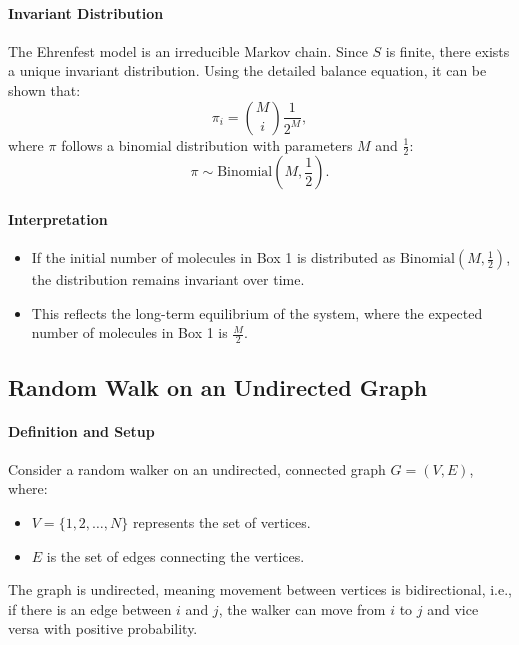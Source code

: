\paragraph{Invariant Distribution}
The Ehrenfest model is an irreducible Markov chain. Since \( S \) is finite, there exists a unique invariant distribution. Using the detailed balance equation, it can be shown that:
\[
\pi_i = \binom{M}{i} \frac{1}{2^M},
\]
where \( \pi \) follows a binomial distribution with parameters \( M \) and \( \frac{1}{2} \):
\[
\pi \sim \text{Binomial}(M, \frac{1}{2}).
\]

\paragraph{Interpretation}
\begin{itemize}
    \item If the initial number of molecules in Box 1 is distributed as \( \text{Binomial}(M, \frac{1}{2}) \), the distribution remains invariant over time.
    \item This reflects the long-term equilibrium of the system, where the expected number of molecules in Box 1 is \( \frac{M}{2} \).
\end{itemize}


\subsection{Random Walk on an Undirected Graph}

\paragraph{Definition and Setup}
Consider a random walker on an undirected, connected graph \( G = (V, E) \), where:
\begin{itemize}
    \item \( V = \{1, 2, \dots, N\} \) represents the set of vertices.
    \item \( E \) is the set of edges connecting the vertices.
\end{itemize}
The graph is undirected, meaning movement between vertices is bidirectional, i.e., if there is an edge between \( i \) and \( j \), the walker can move from \( i \) to \( j \) and vice versa with positive probability.

